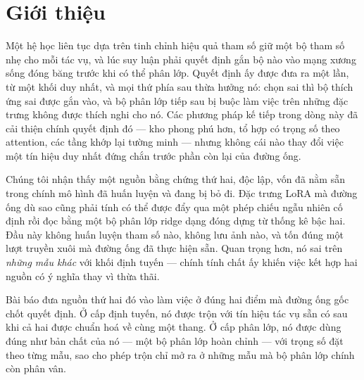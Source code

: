 \documentclass[runningheads]{llncs}
\begin{document}
\section{Giới thiệu}

Một hệ học liên tục dựa trên tinh chỉnh hiệu quả tham số giữ một bộ tham số nhẹ
cho mỗi tác vụ, và lúc suy luận phải quyết định gắn bộ nào vào mạng xương sống
đóng băng trước khi có thể phân lớp. Quyết định ấy được đưa ra một lần, từ một
khối duy nhất, và mọi thứ phía sau thừa hưởng nó: chọn sai thì bộ thích ứng sai
được gắn vào, và bộ phân lớp tiếp sau bị buộc làm việc trên những đặc trưng
không được thích nghi cho nó. Các phương pháp kế tiếp trong dòng này đã cải
thiện chính quyết định đó --- kho phong phú hơn, tổ hợp có trọng số theo
attention, các tầng khớp lại tường minh --- nhưng không cái nào thay đổi việc
một tín hiệu duy nhất đứng chắn trước phần còn lại của đường ống.

Chúng tôi nhận thấy một nguồn bằng chứng thứ hai, độc lập, vốn đã nằm sẵn trong
chính mô hình đã huấn luyện và đang bị bỏ đi. Đặc trưng LoRA mà đường ống dù sao
cũng phải tính có thể được đẩy qua một phép chiếu ngẫu nhiên cố định rồi đọc bằng
một bộ phân lớp ridge dạng đóng dựng từ thống kê bậc hai. Đầu này không huấn
luyện tham số nào, không lưu ảnh nào, và tốn đúng một lượt truyền xuôi mà đường
ống đã thực hiện sẵn. Quan trọng hơn, nó sai trên \emph{những mẫu khác} với khối
định tuyến --- chính tính chất ấy khiến việc kết hợp hai nguồn có ý nghĩa thay vì
thừa thãi.

Bài báo đưa nguồn thứ hai đó vào làm việc ở đúng hai điểm mà đường ống gốc chốt
quyết định. Ở cấp định tuyến, nó được trộn với tín hiệu tác vụ sẵn có sau khi cả
hai được chuẩn hoá về cùng một thang. Ở cấp phân lớp, nó được dùng đúng như bản
chất của nó --- một bộ phân lớp hoàn chỉnh --- với trọng số đặt theo từng mẫu, sao
cho phép trộn chỉ mở ra ở những mẫu mà bộ phân lớp chính còn phân vân.
\end{document}
